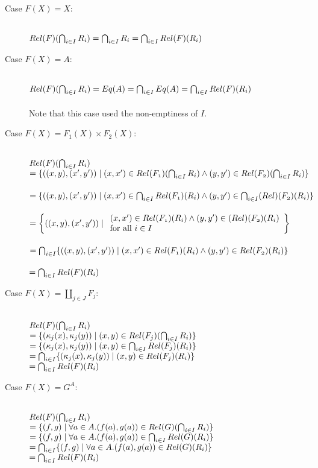 \documentclass{article}
\begin{document}
\begin{description}
\item[Case $F(X) = X$:]~\\
$\mit{Rel}(F)(\bigcap_{i \in I} R_i) = \bigcap_{i \in I} R_i = \bigcap_{i \in I} \mit{Rel}(F)(R_i)$
\item[Case $F(X) = A$:]~\\
$\mit{Rel}(F)(\bigcap_{i \in I} R_i) = \mit{Eq}(A) = \bigcap_{i \in I} \mit{Eq}(A) = \bigcap_{i \in I} \mit{Rel}(F)(R_i)$\\~\\
Note that this case used the non-emptiness of $I$.
\item[Case $F(X) = F_1(X) \times F_2(X)$:]~\\
$\mit{Rel}(F)(\bigcap_{i \in I} R_i)$ \\
$= \{ ((x,y),(x',y')) \mid (x,x') \in \mit{Rel}(F_1)(\bigcap_{i \in I} R_i) \wedge (y,y') \in \mit{Rel}(F_2)(\bigcap_{i \in I} R_i) \}$\\~\\
$= \{ ((x,y),(x',y')) \mid (x,x') \in \bigcap_{i \in I} \mit{Rel}(F_1)(R_i) \wedge (y,y') \in \bigcap_{i \in I} \mit(Rel)(F_2)(R_i) \}$\\~\\
$= \left \{ ((x,y),(x',y')) \mid \begin{array}{ll} (x,x') \in \mit{Rel}(F_1)(R_i) \wedge (y,y') \in \mit(Rel)(F_2)(R_i) \\ \text{for all } i \in I \end{array} \right \}$\\~\\
$= \bigcap_{i \in I} \{ ((x,y),(x',y')) \mid (x,x') \in \mit{Rel}(F_1)(R_i) \wedge (y,y') \in \mit{Rel}(F_2)(R_i)  \}$\\~\\
$= \bigcap_{i \in I} \mit{Rel}(F)(R_i) $
\item[Case $F(X) = \coprod_{j \in J} F_j$:]~\\
$\mit{Rel}(F)(\bigcap_{i \in I} R_i)$\\
$= \{ (\kappa_j(x), \kappa_j(y)) \mid (x,y) \in \mit{Rel}(F_j)(\bigcap_{i \in I} R_i) \}$ \\
$= \{ (\kappa_j(x), \kappa_j(y)) \mid (x,y) \in \bigcap_{i \in I} \mit{Rel}(F_j)(R_i) \}$\\
$= \bigcap_{i \in I} \{ (\kappa_j(x), \kappa_j(y)) \mid (x,y) \in \mit{Rel}(F_j)(R_i) \}$\\
$= \bigcap_{i \in I} \mit{Rel}(F)(R_i)$
\item[Case $F(X) = G^A$:]~\\
$\mit{Rel}(F)(\bigcap_{i \in I} R_i)$\\
$= \{ (f,g) \mid \forall a \in A. (f(a), g(a)) \in \mit{Rel}(G)(\bigcap_{i \in I} R_i) \}$\\
$= \{ (f,g) \mid \forall a \in A. (f(a), g(a)) \in \bigcap_{i \in I} \mit{Rel}(G)(R_i) \}$\\
$= \bigcap_{i \in I} \{ (f,g) \mid \forall a \in A. (f(a), g(a)) \in \mit{Rel}(G)(R_i) \}$\\
$= \bigcap_{i \in I} \mit{Rel}(F)(R_i) $\\
\end{description}~\\
\end{document}
